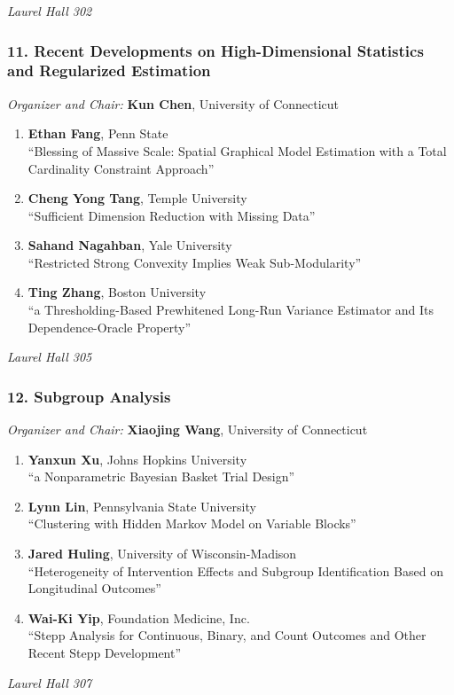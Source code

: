 \emph{Laurel Hall 302} \\[.5em]

\subsubsection*{11. Recent Developments on High-Dimensional Statistics and Regularized Estimation}

\emph{Organizer and Chair:} \textbf{Kun Chen}, University of Connecticut

\begin{enumerate}
\item \textbf{Ethan Fang}, Penn State \\
``Blessing of Massive Scale: Spatial Graphical Model Estimation with a Total Cardinality Constraint Approach''
\item \textbf{Cheng Yong Tang}, Temple University \\
``Sufficient Dimension Reduction with Missing Data''
\item \textbf{Sahand Nagahban}, Yale University \\
``Restricted Strong Convexity Implies Weak Sub-Modularity''
\item \textbf{Ting Zhang}, Boston University \\
``a Thresholding-Based Prewhitened Long-Run Variance Estimator and Its Dependence-Oracle Property''
\end{enumerate}

\emph{Laurel Hall 305} \\[.5em]

\subsubsection*{12. Subgroup Analysis}

\emph{Organizer and Chair:} \textbf{Xiaojing Wang}, University of Connecticut

\begin{enumerate}
\item \textbf{Yanxun Xu}, Johns Hopkins University \\
``a Nonparametric Bayesian Basket Trial Design''
\item \textbf{Lynn Lin}, Pennsylvania State University \\
``Clustering with Hidden Markov Model on Variable Blocks''
\item \textbf{Jared Huling}, University of Wisconsin-Madison \\
``Heterogeneity of Intervention Effects and Subgroup Identification Based on Longitudinal Outcomes''
\item \textbf{Wai-Ki Yip}, Foundation Medicine, Inc. \\
``Stepp Analysis for Continuous, Binary, and Count Outcomes and Other Recent Stepp Development''
\end{enumerate}

\emph{Laurel Hall 307} \\[.5em]

